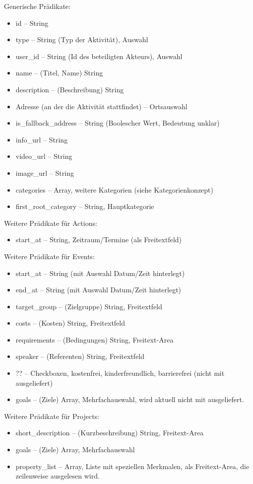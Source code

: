 \documentclass[a4paper,11pt]{article}
\begin{document}
Generische Prädikate:
\begin{itemize}\itemsep0pt
  \item id -- String
  \item type -- String (Typ der Aktivität), Auswahl
  \item user\_id -- String (Id des beteiligten Akteurs), Auswahl
  \item name -- (Titel, Name) String
  \item description -- (Beschreibung) String
  \item Adresse (an der die Aktivität stattfindet) -- Ortsauswahl
  \item is\_fallback\_address -- String (Boolescher Wert, Bedeutung unklar)
  \item info\_url -- String
  \item video\_url -- String
  \item image\_url -- String
  \item categories -- Array, weitere Kategorien (siehe Kategorienkonzept)
  \item first\_root\_category -- String, Hauptkategorie
\end{itemize}

Weitere Prädikate für Actions:
\begin{itemize}\itemsep0pt
  \item start\_at -- String, Zeitraum/Termine (als Freitextfeld)
\end{itemize}

Weitere Prädikate für Events:
\begin{itemize}\itemsep0pt
  \item start\_at -- String (mit Auswahl Datum/Zeit hinterlegt)
  \item end\_at -- String (mit Auswahl Datum/Zeit hinterlegt)
  \item target\_group -- (Zielgruppe) String, Freitextfeld
  \item costs -- (Kosten) String, Freitextfeld
  \item requirements -- (Bedingungen) String, Freitext-Area
  \item speaker -- (Referenten) String, Freitextfeld
  \item ?? -- Checkboxen, kostenfrei, kinderfreundlich, barrierefrei (nicht
    mit ausgeliefert) 
  \item goals -- (Ziele) Array, Mehrfachauswahl, wird aktuell nicht mit
    ausgeliefert.
\end{itemize}

Weitere Prädikate für Projects:
\begin{itemize}\itemsep0pt
  \item short\_description -- (Kurzbeschreibung) String, Freitext-Area
  \item goals -- (Ziele) Array, Mehrfachauswahl
  \item property\_list -- Array, Liste mit speziellen Merkmalen, als
    Freitext-Area, die zeilenweise ausgelesen wird. 
\end{itemize}
\end{document}
